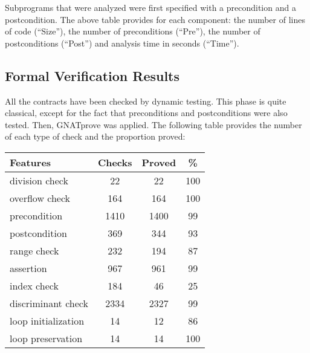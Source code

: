 \documentclass[10pt,a4paper,twocolumn]{article}
\newcommand{\gnatprove}{GNATprove\xspace}
\begin{document}
Subprograms that were analyzed were first specified with a precondition and a
postcondition. The above table provides for each
component: the number of lines of code (``Size''), the number of preconditions
(``Pre''), the number of postconditions (``Post'') and analysis time
in seconds (``Time'').

\subsection{Formal Verification Results}

All the contracts have been checked by dynamic testing. This phase is
quite classical, except for the fact that preconditions and
postconditions were also tested. Then, \gnatprove was applied. The
following table provides the number of each type of check and the
proportion proved:


\begin{tabular}{|l|c|c|c|}
\hline
{\bf Features}            & {\bf Checks} & {\bf Proved} & {\bf \%}  \\
\hline
division check      & 22     & 22     & 100 \\
\hline
overflow check      & 164    & 164    & 100 \\
\hline
precondition        & 1410   & 1400   & 99  \\
\hline
postcondition       & 369    & 344    & 93  \\
\hline
range check         & 232    & 194    & 87  \\
\hline
assertion           & 967    & 961    & 99  \\
\hline
index check         & 184    & 46     & 25  \\
\hline
discriminant check  & 2334   & 2327   & 99  \\
\hline
loop initialization & 14     & 12     & 86  \\
\hline
loop  preservation  & 14     & 14     & 100 \\
\hline
\end{tabular}

\end{document}
